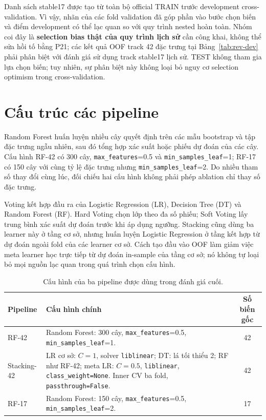 Danh sách stable17 được tạo từ toàn bộ official TRAIN trước development cross-validation. Vì vậy, nhãn của các fold validation đã góp phần vào bước chọn biến và điểm development có thể lạc quan so với quy trình nested hoàn toàn. Nhóm coi đây là \textbf{selection bias thật của quy trình lịch sử} cần công khai, không thể sửa hồi tố bằng P21; các kết quả OOF track 42 đặc trưng tại Bảng~\ref{tab:rev-dev} phải phân biệt với đánh giá sử dụng track stable17 lịch sử. TEST không tham gia lựa chọn biến; tuy nhiên, sự phân biệt này không loại bỏ nguy cơ selection optimism trong cross-validation.

\section{Cấu trúc các pipeline}
\label{sec:method-pipelines}

Random Forest huấn luyện nhiều cây quyết định trên các mẫu bootstrap và tập đặc trưng ngẫu nhiên, sau đó tổng hợp xác suất hoặc phiếu dự đoán của các cây. Cấu hình RF-42 có 300 cây, \texttt{max\_features}=0.5 và \texttt{min\_samples\_leaf}=1; RF-17 có 150 cây với cùng tỷ lệ đặc trưng nhưng \texttt{min\_samples\_leaf}=2. Do nhiều tham số thay đổi cùng lúc, đối chiếu hai cấu hình không phải phép ablation chỉ thay số đặc trưng.

Voting kết hợp đầu ra của Logistic Regression (LR), Decision Tree (DT) và Random Forest (RF). Hard Voting chọn lớp theo đa số phiếu; Soft Voting lấy trung bình xác suất dự đoán trước khi áp dụng ngưỡng. Stacking cũng dùng ba learner này ở tầng cơ sở, nhưng huấn luyện Logistic Regression ở tầng kết hợp từ dự đoán ngoài fold của các learner cơ sở. Cách tạo đầu vào OOF làm giảm việc meta learner học trực tiếp từ dự đoán in-sample của tầng cơ sở; nó không tự loại bỏ mọi nguồn lạc quan trong quá trình chọn cấu hình.

\begin{table}[htbp]
\centering
\small
\renewcommand{\arraystretch}{1.3}
\setlength{\tabcolsep}{6pt}
\caption{Cấu hình của ba pipeline được dùng trong đánh giá cuối.}
\label{tab:frozen-candidates}
\begin{tabularx}{\linewidth}{>{\raggedright\arraybackslash}p{2.5cm}X S[table-format=2.0]}
\toprule
Pipeline & Cấu hình chính & {Số biến gốc}\\
\midrule
RF-42 & Random Forest: 300 cây, \texttt{max\_features}=0.5, \texttt{min\_samples\_leaf}=1. & 42\\
Stacking-42 & LR cơ sở: $C=1$, solver \texttt{liblinear}; DT: lá tối thiểu 2; RF như RF-42; meta LR: $C=0.5$, \texttt{liblinear}, \texttt{class\_weight=None}. Inner CV ba fold, \texttt{passthrough=False}. & 42\\
RF-17 & Random Forest: 150 cây, \texttt{max\_features}=0.5, \texttt{min\_samples\_leaf}=2. & 17\\
\bottomrule
\end{tabularx}
\end{table}

